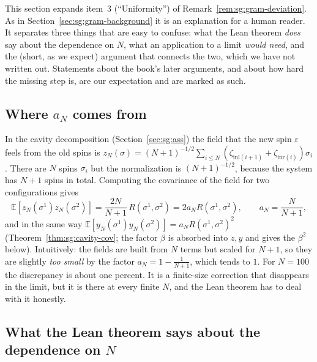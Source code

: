 This section expands item~3 (``Uniformity'') of Remark~\ref{rem:sg:gram-deviation}. As in Section~\ref{sec:sg:gram-background} it is an explanation for a human reader. It separates three things that are easy to confuse:
what the Lean theorem \emph{does} say about the dependence on $N$, what an application to a limit \emph{would need}, and the (short, as we expect) argument that connects the two, which we have not written out.
Statements about the book's later arguments, and about how hard the missing step is, are our expectation and are marked as such.

\subsection*{Where $a_N$ comes from}

In the cavity decomposition (Section~\ref{sec:sg:ass}) the field that the new spin $\varepsilon$ feels from the old spins is $z_N(\sigma)=(N+1)^{-1/2}\sum_{i\le N}(\zeta_{\mathrm{inl}(i+1)}+\zeta_{\mathrm{inr}(i)})\sigma_i$.
There are $N$ spins $\sigma_i$ but the normalization is $(N+1)^{-1/2}$, because the system has $N+1$ spins in total. Computing the covariance of the field for two configurations gives
\[\mathbb E[z_N(\sigma^1)z_N(\sigma^2)]=\frac{2N}{N+1}\,R(\sigma^1,\sigma^2)=2a_NR(\sigma^1,\sigma^2),\qquad a_N=\frac N{N+1},\]
and in the same way $\mathbb E[y_N(\sigma^1)y_N(\sigma^2)]=a_NR(\sigma^1,\sigma^2)^2$ (Theorem~\ref{thm:sg:cavity-cov}; the factor $\beta$ is absorbed into $z,y$ and gives the $\beta^2$ below). Intuitively: the fields are built from $N$ terms but scaled for $N+1$, so they are slightly
\emph{too small} by the factor $a_N=1-\frac1{N+1}$, which tends to $1$. For $N=100$ the discrepancy is about one percent. It is a finite-size correction that disappears in the limit, but it is there at every finite $N$, and the Lean theorem has to deal with it honestly.

\subsection*{What the Lean theorem says about the dependence on $N$}

